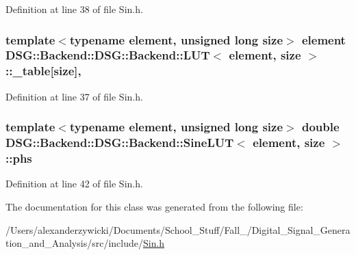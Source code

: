 Definition at line 38 of file Sin.\+h.

\hypertarget{classDSG_1_1Backend_1_1DSG_1_1Backend_1_1LUT_a427da4b7eccdfe25e3c1889a8c2fdea6}{
\subsubsection[{\+\_\+table}]{\setlength{\rightskip}{0pt plus 5cm}template$<$typename element, unsigned long size$>$ element {\bf D\+S\+G\+::\+Backend\+::\+D\+S\+G\+::\+Backend\+::\+L\+U\+T}$<$ element, size $>$\+::\+\_\+table\mbox{[}size\mbox{]}\hspace{0.3cm}{\ttfamily [protected]}, {\ttfamily [inherited]}}}\label{classDSG_1_1Backend_1_1DSG_1_1Backend_1_1LUT_a427da4b7eccdfe25e3c1889a8c2fdea6}


Definition at line 37 of file Sin.\+h.

\hypertarget{classDSG_1_1Backend_1_1DSG_1_1Backend_1_1SineLUT_a5ea74e278f77c7f0196fa642ccf45b40}{
\subsubsection[{phs}]{\setlength{\rightskip}{0pt plus 5cm}template$<$typename element, unsigned long size$>$ double {\bf D\+S\+G\+::\+Backend\+::\+D\+S\+G\+::\+Backend\+::\+Sine\+L\+U\+T}$<$ element, size $>$\+::phs\hspace{0.3cm}{\ttfamily [protected]}}}\label{classDSG_1_1Backend_1_1DSG_1_1Backend_1_1SineLUT_a5ea74e278f77c7f0196fa642ccf45b40}


Definition at line 42 of file Sin.\+h.



The documentation for this class was generated from the following file\+:\begin{DoxyCompactItemize}
\item 
/\+Users/alexanderzywicki/\+Documents/\+School\+\_\+\+Stuff/\+Fall\+\_/\+Digital\+\_\+\+Signal\+\_\+\+Generation\+\_\+and\+\_\+\+Analysis/src/include/\hyperlink{Sin_8h}{Sin.\+h}\end{DoxyCompactItemize}
